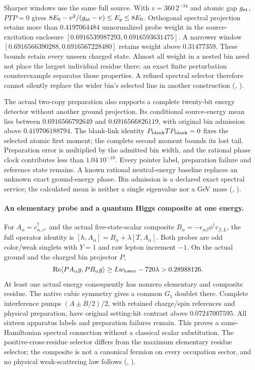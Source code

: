 Sharper windows use the same full source. With $v=360\,2^{-34}$ and
atomic gap $g_{\rm at}$, $PTP=0$ gives
$8E_0-v^2/(g_{\rm at}-v)\le E_g\le8E_0$. Orthogonal spectral
projection retains more than $0.4197064484$ unnormalized probe weight in
the source-excitation enclosure
$[0.6916539987293,0.6916593631475]$. A narrower window
$[0.6916566390288,0.6916567228480]$ retains weight above $0.31477359$.
These bounds retain every unseen charged state. Almost all weight in a
nested bin need not place the largest individual residue there: an exact
finite perturbation counterexample separates those properties. A refined
spectral selector therefore cannot silently replace the wider bin's
selected line in another construction
(, \cite{ophrepo}).

The actual two-copy preparation also supports a complete twenty-bit
energy detector without another ground projection. Its conditional
source-energy mean lies between
$0.6916566792649$ and $0.6916566826119$, with original bin admission above
$0.419706188794$. The blank-link identity $P_{\rm blank}TP_{\rm blank}=0$
fixes the selected atomic first moment; the complete second moment bounds
its lost tail. Preparation error is multiplied by the admitted bin width,
and the rational phase clock contributes less than $1.04\,10^{-10}$.
Every pointer label, preparation failure and reference state remains.
A known rational neutral-energy baseline replaces an unknown exact
ground-energy phase. Bin admission is a declared exact spectral service;
the calculated mean is neither a single eigenvalue nor a GeV mass
(, \cite{ophrepo}).

\paragraph{An elementary probe and a quantum Higgs composite at one energy.}
For $A_\alpha=c^\dagger_{\alpha,e^c}$ and the actual five-state-scalar
composite $B_\alpha=-\epsilon_{\alpha\beta}\phi^\dagger c_{\beta,L}$,
the full operator identity is
$[h,A_\alpha]=B_\alpha+\lambda[T,A_\alpha]$.
Both probes are odd color/weak singlets with $Y=1$ and raw lepton
increment $-1$. On the actual ground and the charged bin projector $P$,
\[
 \operatorname{Re}\langle PA_\alpha g,PB_\alpha g\rangle
 \ge Lw_{\rm lower}-720\lambda>0.28988126.
\]
At least one actual energy consequently has nonzero elementary and
composite residue. The native cubic symmetry gives a common $G_1$
doublet there. Complete interference pumps $(A\pm B/2)/2$, with retained
charge/spin references and physical preparation, have original
setting-hit contrast above $0.07247007595$. All sixteen apparatus labels
and preparation failures remain. This proves a same-Hamiltonian
spectral connection without a classical scalar substitution. The
positive-cross-residue selector differs from the maximum elementary
residue selector; the composite is not a canonical fermion on every
occupation sector, and no physical weak-scattering law follows
(, \cite{ophrepo}).

